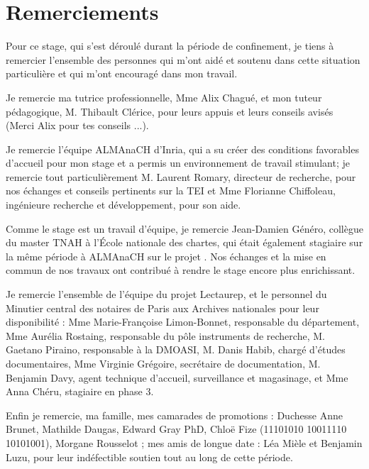 \chapter*{Remerciements}

Pour ce stage, qui s'est déroulé durant la période de confinement, je tiens à remercier l'ensemble des personnes qui m'ont aidé et soutenu dans cette situation particulière et qui m'ont encouragé dans mon travail.

Je remercie ma tutrice professionnelle, Mme Alix Chagué, et mon tuteur pédagogique, M. Thibault Clérice, pour leurs appuis et leurs conseils avisés (Merci Alix pour tes conseils ...).

Je remercie l'équipe ALMAnaCH d'Inria, qui a su créer des conditions favorables d'accueil pour mon stage et a permis un environnement de travail stimulant; je remercie tout particulièrement M. Laurent Romary, directeur de recherche, pour nos échanges et conseils pertinents sur la TEI et Mme Florianne Chiffoleau, ingénieure recherche et développement, pour son aide.

Comme le stage est un travail d'équipe, je remercie Jean-Damien Généro, collègue du master TNAH à l'École nationale des chartes, qui était également stagiaire sur la même période à ALMAnaCH sur le projet . Nos échanges et la mise en commun de nos travaux ont contribué à rendre le stage encore plus enrichissant.

Je remercie l'ensemble de l'équipe du projet Lectaurep, et le personnel du Minutier central des notaires de Paris aux Archives nationales pour leur disponibilité : Mme Marie-Françoise Limon-Bonnet, responsable du département, Mme Aurélia Rostaing, responsable du pôle instruments de recherche, M. Gaetano Piraino, responsable à la DMOASI, M. Danis Habib, chargé d'études documentaires, Mme Virginie Grégoire, secrétaire de documentation, M. Benjamin Davy, agent technique d'accueil, surveillance et magasinage, et Mme Anna Chéru, stagiaire en phase 3. 

Enfin je remercie, ma famille, mes camarades de promotions : Duchesse Anne Brunet, Mathilde Daugas, Edward Gray PhD, Chloë Fize (11101010 10011110 10101001), Morgane Rousselot ; mes amis de longue date : Léa Mièle et Benjamin Luzu, pour leur indéfectible soutien tout au long de cette période. 
\newpage
\thispagestyle{empty}